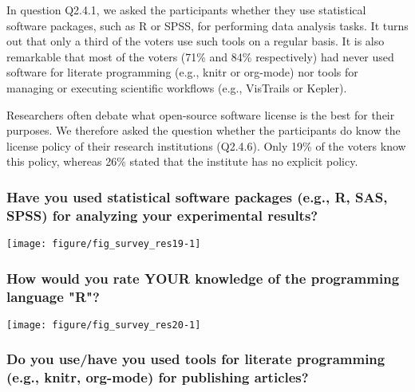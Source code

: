 \documentclass{article}\usepackage[]{graphicx}\usepackage[]{color}
\newenvironment{knitrout}{}{}
\newcommand{\eg}{e.g.\xspace}
\newcommand{\ques}[2]{Q2.#1.#2\xspace}
\begin{document}
In question \ques{4}{1}, we asked the participants whether they use
statistical software packages, such as R or SPSS, for performing data
analysis tasks. It turns out that only a third of the voters use such
tools on a regular basis. It is also remarkable that most of the
voters (71\% and 84\% respectively) had never used software for
literate programming (\eg, knitr or org-mode) nor tools for managing
or executing scientific workflows (\eg, VisTrails or Kepler).

Researchers often debate what open-source software license is the best
for their purposes. We therefore asked the question whether the
participants do know the license policy of their research institutions
(\ques{4}{6}). Only 19\% of the voters know this policy, whereas 26\%
stated that the institute has no explicit policy.




\subsubsection{Have you used statistical software packages (e.g., R, SAS, SPSS) for analyzing your experimental results?}

\begin{knitrout}
\color{fgcolor}

{\centering \texttt{[image: figure/fig\_survey\_res19-1]} 

}



\end{knitrout}


\newpage


\subsubsection{How would you rate YOUR knowledge of the programming language "R"?}

\begin{knitrout}
\color{fgcolor}

{\centering \texttt{[image: figure/fig\_survey\_res20-1]} 

}



\end{knitrout}





\subsubsection{Do you use/have you used tools for literate programming (e.g., knitr, org-mode) for publishing articles?}
\end{document}
